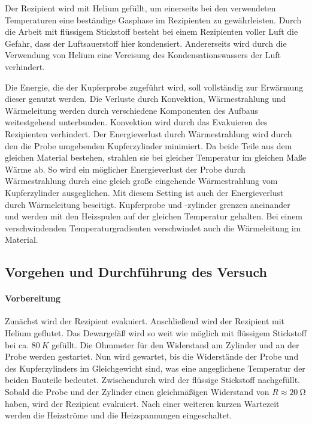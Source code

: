 Der Rezipient wird mit Helium gefüllt, um einerseits bei den verwendeten Temperaturen eine beständige Gasphase im Rezipienten zu gewährleisten.
Durch die Arbeit mit flüssigem Stickstoff besteht bei einem Rezipienten voller Luft die Gefahr, dass der Luftsauerstoff hier kondensiert.
Andererseits wird durch die Verwendung von Helium eine Vereisung des Kondensationswassers der Luft verhindert.


Die Energie, die der Kupferprobe zugeführt wird, soll vollständig zur Erwärmung dieser genutzt werden.
Die Verluste durch Konvektion, Wärmestrahlung und Wärmeleitung werden durch verschiedene Komponenten des Aufbaus weitestgehend unterbunden.
Konvektion wird durch das Evakuieren des Rezipienten verhindert.
Der Energieverlust durch Wärmestrahlung wird durch den die Probe umgebenden Kupferzylinder minimiert.
Da beide Teile aus dem gleichen Material bestehen, strahlen sie bei gleicher Temperatur im gleichen Maße Wärme ab.
So wird ein möglicher Energieverlust der Probe durch Wärmestrahlung durch eine gleich große eingehende Wärmestrahlung vom Kupferzylinder ausgeglichen.
Mit diesem Setting ist auch der Energieverlust durch Wärmeleitung beseitigt.
Kupferprobe und -zylinder grenzen aneinander und werden mit den Heizspulen auf der gleichen Temperatur gehalten.
Bei einem verschwindenden Temperaturgradienten verschwindet auch die Wärmeleitung im Material.

\subsection{Vorgehen und Durchführung des Versuch}
\paragraph{Vorbereitung}
Zunächst wird der Rezipient evakuiert.
Anschließend wird der Rezipient mit Helium geflutet.
Das Dewargefäß wird so weit wie möglich mit flüssigem Stickstoff bei ca. $\SI{80}{K}$ gefüllt.
Die Ohmmeter für den Widerstand am Zylinder und an der Probe werden gestartet.
Nun wird gewartet, bis die Widerstände der Probe und des Kupferzylinders im Gleichgewicht sind, was eine angeglichene Temperatur der beiden Bauteile bedeutet.
Zwischendurch wird der flüssige Stickstoff nachgefüllt.
Sobald die Probe und der Zylinder einen gleichmäßigen Widerstand von $R \approx \SI{20}{\ohm}$ haben, wird der Rezipient evakuiert.
Nach einer weiteren kurzen Wartezeit werden die Heizströme und die Heizspannungen eingeschaltet.

